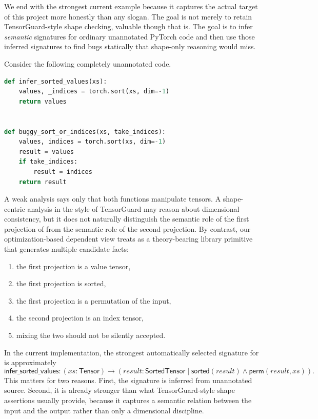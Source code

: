 \documentclass[11pt]{article}
\newcommand{\py}[1]{\texttt{\detokenize{#1}}}
\theoremstyle{definition}
\theoremstyle{plain}
\begin{document}
We end with the strongest current example because it captures the actual target
of this project more honestly than any slogan. The goal is not merely to retain
TensorGuard-style shape checking, valuable though that is. The goal is to infer
\emph{semantic} signatures for ordinary unannotated PyTorch code and then use
those inferred signatures to find bugs statically that shape-only reasoning would
miss.

Consider the following completely unannotated code.
\begin{lstlisting}[style=deppy,language=Python]
def infer_sorted_values(xs):
    values, _indices = torch.sort(xs, dim=-1)
    return values


def buggy_sort_or_indices(xs, take_indices):
    values, indices = torch.sort(xs, dim=-1)
    result = values
    if take_indices:
        result = indices
    return result
\end{lstlisting}

A weak analysis says only that both functions manipulate tensors. A shape-centric
analysis in the style of TensorGuard may reason about dimensional consistency,
but it does not naturally distinguish the semantic role of the first projection
of \py{torch.sort} from the semantic role of the second projection. By contrast,
our optimization-based dependent view treats \py{torch.sort} as a theory-bearing
library primitive that generates multiple candidate facts:
\begin{enumerate}[label=\arabic*.]
  \item the first projection is a value tensor,
  \item the first projection is sorted,
  \item the first projection is a permutation of the input,
  \item the second projection is an index tensor,
  \item mixing the two should not be silently accepted.
\end{enumerate}

In the current implementation, the strongest automatically selected signature for
\py{infer\_sorted\_values} is approximately
\[
\mathsf{infer\_sorted\_values} :
(xs : \mathsf{Tensor}) \to
(result : \mathsf{SortedTensor} \mid \mathsf{sorted}(result) \wedge \mathsf{perm}(result, xs)).
\]
This matters for two reasons. First, the signature is inferred from unannotated
source. Second, it is already stronger than what TensorGuard-style shape
assertions usually provide, because it captures a semantic relation between the
input and the output rather than only a dimensional discipline.
\end{document}
